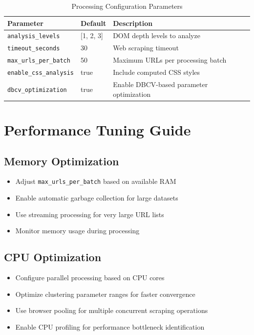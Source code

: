 \begin{table}[h]
\centering
\caption{Processing Configuration Parameters}
\begin{tabular}{|l|l|l|}
\hline
\textbf{Parameter} & \textbf{Default} & \textbf{Description} \\
\hline
\texttt{analysis\_levels} & [1, 2, 3] & DOM depth levels to analyze \\
\texttt{timeout\_seconds} & 30 & Web scraping timeout \\
\texttt{max\_urls\_per\_batch} & 50 & Maximum URLs per processing batch \\
\texttt{enable\_css\_analysis} & true & Include computed CSS styles \\
\texttt{dbcv\_optimization} & true & Enable DBCV-based parameter optimization \\
\hline
\end{tabular}
\end{table}

\section{Performance Tuning Guide}
\label{app:performance_tuning}

\subsection{Memory Optimization}

\begin{itemize}
\item Adjust \texttt{max\_urls\_per\_batch} based on available RAM
\item Enable automatic garbage collection for large datasets
\item Use streaming processing for very large URL lists
\item Monitor memory usage during processing
\end{itemize}

\subsection{CPU Optimization}

\begin{itemize}
\item Configure parallel processing based on CPU cores
\item Optimize clustering parameter ranges for faster convergence
\item Use browser pooling for multiple concurrent scraping operations
\item Enable CPU profiling for performance bottleneck identification
\end{itemize}

